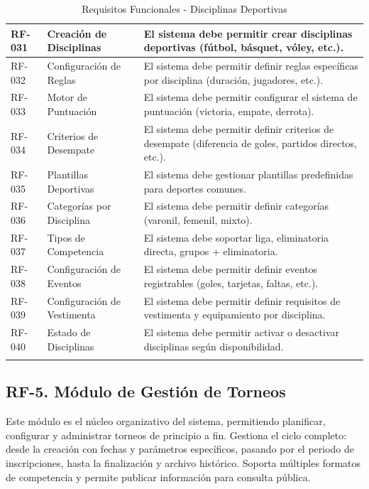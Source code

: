 \documentclass[12pt,a4paper]{article}
\begin{document}
\begin{longtable}{|>{\centering\arraybackslash}p{1.5cm}|>{\raggedright\arraybackslash}p{3.2cm}|>{\raggedright\arraybackslash}p{9cm}|}
RF-031 & Creación de Disciplinas & El sistema debe permitir crear disciplinas deportivas (fútbol, básquet, vóley, etc.). \\
\hline
\rowcolor{rowgray}
RF-032 & Configuración de Reglas & El sistema debe permitir definir reglas específicas por disciplina (duración, jugadores, etc.). \\
\hline
RF-033 & Motor de Puntuación & El sistema debe permitir configurar el sistema de puntuación (victoria, empate, derrota). \\
\hline
\rowcolor{rowgray}
RF-034 & Criterios de Desempate & El sistema debe permitir definir criterios de desempate (diferencia de goles, partidos directos, etc.). \\
\hline
RF-035 & Plantillas Deportivas & El sistema debe gestionar plantillas predefinidas para deportes comunes. \\
\hline
\rowcolor{rowgray}
RF-036 & Categorías por Disciplina & El sistema debe permitir definir categorías (varonil, femenil, mixto). \\
\hline
RF-037 & Tipos de Competencia & El sistema debe soportar liga, eliminatoria directa, grupos + eliminatoria. \\
\hline
\rowcolor{rowgray}
RF-038 & Configuración de Eventos & El sistema debe permitir definir eventos registrables (goles, tarjetas, faltas, etc.). \\
\hline
RF-039 & Configuración de Vestimenta & El sistema debe permitir definir requisitos de vestimenta y equipamiento por disciplina. \\
\hline
\rowcolor{rowgray}
RF-040 & Estado de Disciplinas & El sistema debe permitir activar o desactivar disciplinas según disponibilidad. \\
\hline
\caption{Requisitos Funcionales - Disciplinas Deportivas}
\end{longtable}

\subsection{RF-5. Módulo de Gestión de Torneos}

Este módulo es el núcleo organizativo del sistema, permitiendo planificar, configurar y administrar torneos de principio a fin. Gestiona el ciclo completo: desde la creación con fechas y parámetros específicos, pasando por el periodo de inscripciones, hasta la finalización y archivo histórico. Soporta múltiples formatos de competencia y permite publicar información para consulta pública.
\end{document}
